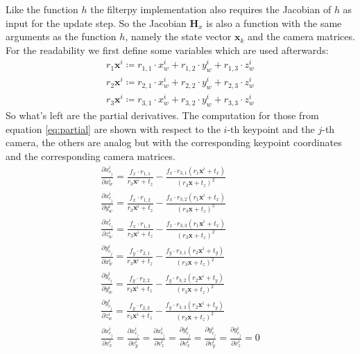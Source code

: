 Like the function $h$ the filterpy \cite{filterpydoc} implementation also requires the Jacobian of $h$ as input for the update step. So the Jacobian $\mathbf{H}_x$ is also a function with the same arguments as the function $h$, namely the state vector $\mathbf{x}_k$ and the camera matrices. For the readability we first define some variables which are used afterwards:
\begin{align}
r_{1}\mathbf{x}^i \coloneqq r_{1,1} \cdot x_w^i + r_{1,2} \cdot y_w^i + r_{1,3} \cdot z_w^i \\
r_{2}\mathbf{x}^i \coloneqq r_{2,1} \cdot x_w^i + r_{2,2} \cdot y_w^i + r_{2,3} \cdot z_w^i \\
r_{3}\mathbf{x}^i \coloneqq r_{3,1} \cdot x_w^i + r_{3,2} \cdot y_w^i + r_{3,3} \cdot z_w^i
\end{align}
So what's left are the partial derivatives. The computation for those from equation \ref{eq:partial} are shown with respect to the $i$-th keypoint and the $j$-th camera, the others are analog but with the corresponding keypoint coordinates and the corresponding camera matrices.
\begin{align}
\frac{\partial x^i_{c_j}}{\partial x^i_w} = \frac{f_x \cdot r_{1,1}}{r_{3}\mathbf{x}^i + t_z} - \frac{f_x \cdot r_{3,1}(r_{1}\mathbf{x}^i + t_x)}{(r_{3}\mathbf{x} + t_z)^2}\\
\frac{\partial x^i_{c_j}}{\partial y^i_w} = \frac{f_x \cdot r_{1,2}}{r_{3}\mathbf{x}^i + t_z} - \frac{f_x \cdot r_{3,2}(r_{1}\mathbf{x}^i + t_x)}{(r_{3}\mathbf{x} + t_z)^2}\\
\frac{\partial x^i_{c_j}}{\partial z^i_w} = \frac{f_x \cdot r_{1,3}}{r_{3}\mathbf{x}^i + t_z} - \frac{f_x \cdot r_{3,3}(r_{1}\mathbf{x}^i + t_x)}{(r_{3}\mathbf{x} + t_z)^2}\\
\frac{\partial y^i_{c_j}}{\partial x^i_w} = \frac{f_y \cdot r_{2,1}}{r_{3}\mathbf{x}^i + t_z} - \frac{f_y \cdot r_{3,1}(r_{2}\mathbf{x}^i + t_y)}{(r_{3}\mathbf{x} + t_z)^2}\\
\frac{\partial y^i_{c_j}}{\partial y^i_w} = \frac{f_y \cdot r_{2,2}}{r_{3}\mathbf{x}^i + t_z} - \frac{f_y \cdot r_{3,2}(r_{2}\mathbf{x}^i + t_y)}{(r_{3}\mathbf{x} + t_z)^2}\\
\frac{\partial y^i_{c_j}}{\partial z^i_w} = \frac{f_y \cdot r_{2,3}}{r_{3}\mathbf{x}^i + t_z} - \frac{f_y \cdot r_{3,3}(r_{2}\mathbf{x}^i + t_y)}{(r_{3}\mathbf{x} + t_z)^2}\\ \frac{\partial x^i_{c_j}}{\partial v^i_x} = \frac{\partial x^i_{c_j}}{\partial v^i_y} = \frac{\partial x^i_{c_j}}{\partial v^i_z} = \frac{\partial y^i_{c_j}}{\partial v^i_x} = \frac{\partial y^i_{c_j}}{\partial v^i_y} = \frac{\partial y^i_{c_j}}{\partial v^i_z} = 0
\end{align}

